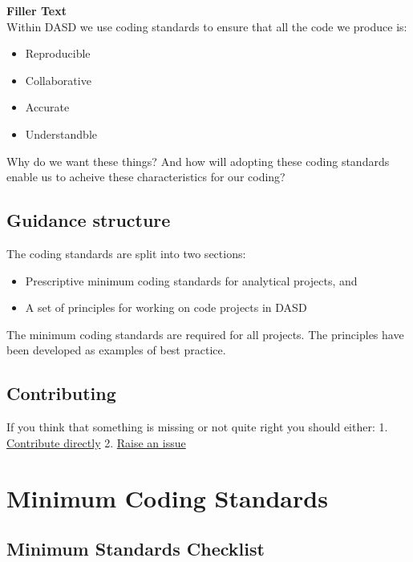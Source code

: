 \documentclass[]{book}
\providecommand{\tightlist}{%
  \setlength{\itemsep}{0pt}\setlength{\parskip}{0pt}}
\begin{document}
\textbf{Filler Text}\\
Within DASD we use coding standards to ensure that all the code we produce is:

\begin{itemize}
\tightlist
\item
  Reproducible
\item
  Collaborative
\item
  Accurate
\item
  Understandble
\end{itemize}

Why do we want these things? And how will adopting these coding standards enable us to acheive these characteristics for our coding?

\hypertarget{structure}{%
\section{Guidance structure}\label{structure}}

The coding standards are split into two sections:

\begin{itemize}
\tightlist
\item
  Prescriptive minimum coding standards for analytical projects, and
\item
  A set of principles for working on code projects in DASD
\end{itemize}

The minimum coding standards are required for all projects.
The principles have been developed as examples of best practice.

\hypertarget{contributing}{%
\section{Contributing}\label{contributing}}

If you think that something is missing or not quite right you should either:
1. \protect\hyperlink{versioncontrol}{Contribute directly}
2. \href{https://github.com/moj-analytical-services/our-coding-standards/issues}{Raise an issue}

\hypertarget{mcs}{%
\chapter{Minimum Coding Standards}\label{mcs}}

\hypertarget{mcschecklist}{%
\section{Minimum Standards Checklist}\label{mcschecklist}}
\end{document}
